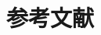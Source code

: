 \section*{参考文献} 
	\renewcommand{\refname}{\textbf{\kaishu\zihao{5}参考文献}} %

\begin{spacing}{1.0} %
\setlength{\parindent}{0pt} %
\setlength{\parskip}{0.5\baselineskip} %
\renewcommand{\bibfont}{\kaishu\zihao{-5}} %

\printbibliography[heading=none] %
\end{spacing} %